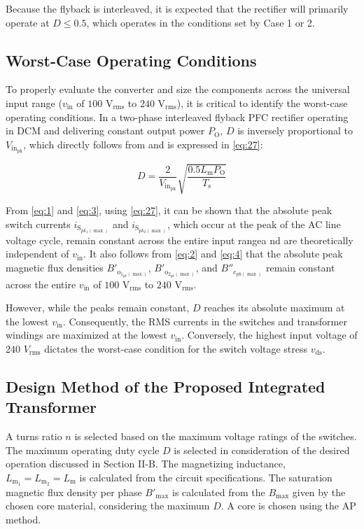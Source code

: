 \documentclass[lettersize,journal]{IEEEtran}
\begin{document}
Because the flyback is interleaved, it is expected that the rectifier will primarily operate at $D \le 0.5$, which operates in the conditions set by Case 1 or 2.
{\color{red}
\subsection{Worst-Case Operating Conditions}
To properly evaluate the converter and size the components across the universal input range ($v_{\text{in}}$ of $100\text{ V}_{\text{rms}}$ to $240\text{ V}_{\text{rms}}$), it is critical to identify the worst-case operating conditions. In a two-phase interleaved flyback PFC rectifier operating in DCM and delivering constant output power $P_{\text{O}}$, $D$ is inversely proportional to $V_{\text{in}_\mathrm{pk}}$, which directly follows from \cite{ref8} and is expressed in \eqref{eq:27}:

\begin{equation}
\label{eq:27}
D = \frac{2}{V_{\mathrm{in}_{\mathrm{pk}}}} \sqrt{\frac{0.5 L_{\mathrm{m}} P_{\mathrm{O}}}{T_{\mathrm{s}}}}
\end{equation}

From \eqref{eq:1} and \eqref{eq:3}, using \eqref{eq:27}, it can be shown that the absolute peak switch currents $i_{\mathrm{S}_{pk_1(\max)}}$ and $i_{\mathrm{S}_{pk_2(\max)}}$, which occur at the peak of the AC line voltage cycle, remain constant across the entire input rangea nd are theoretically independent of $v_{\mathrm{in}}$. It also follows from \eqref{eq:2} and \eqref{eq:4} that the absolute peak magnetic flux densities $B'_{\mathrm{o}_{1_{pk}(\max)}}$, $B'_{\mathrm{o}_{2_{pk}(\max)}}$, and $B''_{\mathrm{c}_{pk(\max)}}$ remain constant across the entire $v_{\text{in}}$ of $100\text{ V}_{\text{rms}}$ to $240\text{ V}_{\text{rms}}$. 

However, while the peaks remain constant, $D$ reaches its absolute maximum at the lowest $v_{\text{in}}$. Consequently, the RMS currents in the switches and transformer windings are maximized at the lowest $v_{\text{in}}$. Conversely, the highest input voltage of 240 $V_\mathrm{rms}$ dictates the worst-case condition for the switch voltage stress $v_{\mathrm{ds}}$.
}
\subsection{Design Method of the Proposed Integrated Transformer}
A turns ratio $n$ is selected based on the maximum voltage ratings of the switches. The maximum operating duty cycle $D$ is selected in consideration of the desired operation discussed in Section II-B. The magnetizing inductance, $L_{\mathrm{m}_1}=L_{\mathrm{m}_2}=L_{\mathrm{m}}$ is calculated from the circuit specifications. The saturation magnetic flux density per phase $B'_{\mathrm{max}}$ is calculated from the $B_{\mathrm{max}}$ given by the chosen core material, considering the maximum $D$. A core is chosen using the AP method. 
\end{document}
